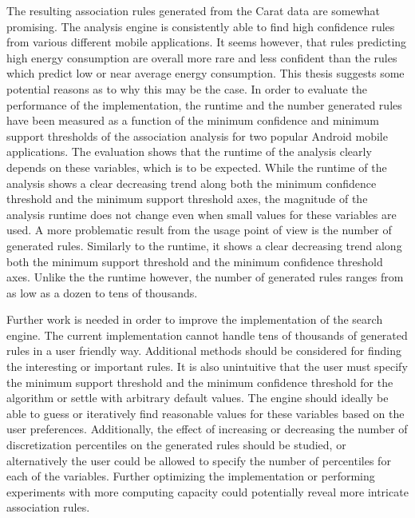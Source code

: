 The resulting association rules generated from the Carat data are somewhat promising. The analysis engine is consistently able to find high confidence rules from various different mobile applications. It seems however, that rules predicting high energy consumption are overall more rare and less confident than the rules which predict low or near average energy consumption. This thesis suggests some potential reasons as to why this may be the case. In order to evaluate the performance of the implementation, the runtime and the number generated rules have been measured as a function of the minimum confidence and minimum support thresholds of the association analysis for two popular Android mobile applications. The evaluation shows that the runtime of the analysis clearly depends on these variables, which is to be expected. While the runtime of the analysis shows a clear decreasing trend along both the minimum confidence threshold and the minimum support threshold axes, the magnitude of the analysis runtime does not change even when small values for these variables are used. A more problematic result from the usage point of view is the number of generated rules. Similarly to the runtime, it shows a clear decreasing trend along both the minimum support threshold and the minimum confidence threshold axes. Unlike the the runtime however, the number of generated rules ranges from as low as a dozen to tens of thousands. 

Further work is needed in order to improve the implementation of the search engine. The current implementation cannot handle tens of thousands of generated rules in a user friendly way. Additional methods should be considered for finding the interesting or important rules. It is also unintuitive that the user must specify the minimum support threshold and the minimum confidence threshold for the algorithm or settle with arbitrary default values. The engine should ideally be able to guess or iteratively find reasonable values for these variables based on the user preferences. Additionally, the effect of increasing or decreasing the number of discretization percentiles on the generated rules should be studied, or alternatively the user could be allowed to specify the number of percentiles for each of the variables. Further optimizing the implementation or performing experiments with more computing capacity could potentially reveal more intricate association rules.                

             